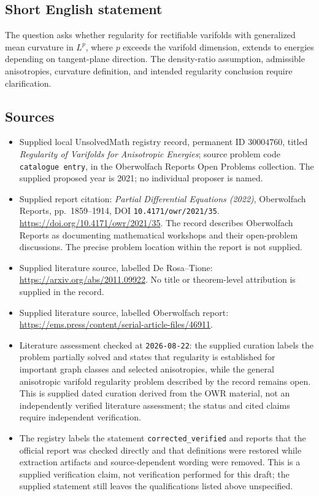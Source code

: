 \documentclass[11pt]{article}
\begin{document}
\subsection{Short English statement}
The question asks whether regularity for rectifiable varifolds with generalized mean curvature in \(L^p\), where \(p\) exceeds the varifold dimension, extends to energies depending on tangent-plane direction. The density-ratio assumption, admissible anisotropies, curvature definition, and intended regularity conclusion require clarification.
\subsection{Sources}
\begin{itemize}
\item Supplied local UnsolvedMath registry record, permanent ID \(30004760\), titled \emph{Regularity of Varifolds for Anisotropic Energies}; source problem code \texttt{catalogue entry}, in the Oberwolfach Reports Open Problems collection. The supplied proposed year is 2021; no individual proposer is named.
\item Supplied report citation: \emph{Partial Differential Equations (2022)}, Oberwolfach Reports, pp.\ 1859--1914, DOI \texttt{10.4171/owr/2021/35}. \url{https://doi.org/10.4171/owr/2021/35}. The record describes Oberwolfach Reports as documenting mathematical workshops and their open-problem discussions. The precise problem location within the report is not supplied.
\item Supplied literature source, labelled De Rosa--Tione: \url{https://arxiv.org/abs/2011.09922}. No title or theorem-level attribution is supplied in the record.
\item Supplied literature source, labelled Oberwolfach report: \url{https://ems.press/content/serial-article-files/46911}.
\item Literature assessment checked at \texttt{2026-08-22}: the supplied curation labels the problem partially solved and states that regularity is established for important graph classes and selected anisotropies, while the general anisotropic varifold regularity problem described by the record remains open. This is supplied dated curation derived from the OWR material, not an independently verified literature assessment; the status and cited claims require independent verification.
\item The registry labels the statement \texttt{corrected\_verified} and reports that the official report was checked directly and that definitions were restored while extraction artifacts and source-dependent wording were removed. This is a supplied verification claim, not verification performed for this draft; the supplied statement still leaves the qualifications listed above unspecified.
\end{itemize}
\end{document}
